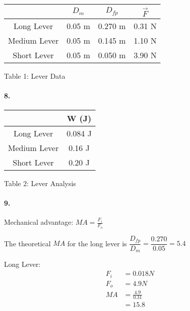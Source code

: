     \begin{center}
    \begin{tabular}{|c|c|c|c|}
        \hline
            & $D_{m}$ & $D_{fp}$ & $\vec{F}$    \\
        \hline
        Long Lever      & 0.05 m & 0.270 m & 0.31 N    \\
        \hline
        Medium Lever    & 0.05 m & 0.145 m & 1.10 N    \\
        \hline
        Short Lever     & 0.05 m & 0.050 m & 3.90 N    \\
        \hline
    \end{tabular}

    Table 1: Lever Data
    \end{center}

    \paragraph*{8.}

    \begin{center}
        \begin{tabular}{|c|c|}
            \hline
                & W (J)    \\
            \hline
            Long Lever      & 0.084 J   \\
            \hline
            Medium Lever    & 0.16 J    \\
            \hline
            Short Lever     & 0.20 J    \\
            \hline
        \end{tabular}

        Table 2: Lever Analysis
        \end{center}

    \paragraph*{9.}
    Mechanical advantage: $MA = \frac{F_{i}}{F_{o}}$

    The theoretical $MA$ for the long lever is $\dfrac{D_{fp}}{D_{m}} = \dfrac{0.270}{0.05} = \boxed{5.4}$

    Long Lever:
    \begin{align*}
        F_{i}   & = 0.018 N                     \\
        F_{o}   & = 4.9 N                       \\
        MA      & = \frac{4.9}{0.31}                \\
                & = \boxed{15.8}
    \end{align*}

